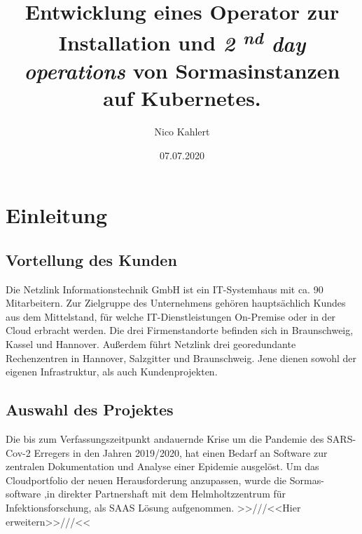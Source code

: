 \documentclass[a4paper,11pt]{article}
\title{
  Entwicklung eines Operator zur Installation und 
  \textit{2
  \textsuperscript{nd} day operations
  } von Sormasinstanzen auf Kubernetes.
}
\date{07.07.2020}
\author{Nico Kahlert}
\begin{document}
  \maketitle
  \newpage
  \tableofcontents
  \newpage
  \vspace{2.5cm}
  \section{Einleitung}
    \subsection{Vortellung des Kunden}
    Die Netzlink Informationstechnik GmbH ist ein IT-Systemhaus mit ca. 90
    Mitarbeitern. Zur Zielgruppe des Unternehmens gehören hauptsächlich 
    Kundes aus dem Mittelstand, für welche IT-Dienstleistungen On-Premise oder in der Cloud
    erbracht werden. Die drei Firmenstandorte befinden sich in Braunschweig, Kassel und Hannover.
    Außerdem führt Netzlink drei georedundante Rechenzentren in Hannover, Salzgitter und Braunschweig.
    Jene dienen sowohl der eigenen Infrastruktur, als auch Kundenprojekten. 
    \subsection{Auswahl des Projektes}
    Die bis zum Verfassungszeitpunkt andauernde Krise um die Pandemie des SARS-Cov-2 Erregers 
    in den Jahren 2019/2020, hat einen Bedarf an Software zur zentralen Dokumentation und Analyse 
    einer Epidemie ausgelöst. Um das Cloudportfolio der neuen Herausforderung anzupassen, wurde die Sormas-
    software ,in direkter Partnershaft mit dem Helmholtzzentrum für Infektionsforschung, als SAAS Lösung 
    aufgenommen. \newline >>///<<Hier erweitern>>///<<
\end{document}
